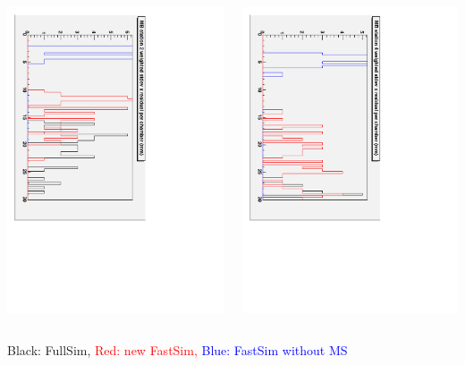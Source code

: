 \documentclass[compress]{beamer}
\begin{document}
\begin{frame}
\begin{columns}
\includegraphics[height=\linewidth, angle=90]{stdevs_mb2.pdf}

\includegraphics[height=\linewidth, angle=90]{stdevs_mb4.pdf}
\end{columns}

\small
Black: FullSim, \textcolor{red}{Red: new FastSim,} \textcolor{blue}{Blue: FastSim without MS}
\end{frame}
\end{document}
